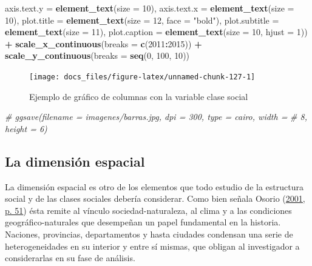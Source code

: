 \documentclass[
]{article}
\newenvironment{Shaded}{\begin{snugshade}}{\end{snugshade}}
\newcommand{\AttributeTok}[1]{\textcolor[rgb]{0.13,0.29,0.53}{#1}}
\newcommand{\CommentTok}[1]{\textcolor[rgb]{0.56,0.35,0.01}{\textit{#1}}}
\newcommand{\DecValTok}[1]{\textcolor[rgb]{0.00,0.00,0.81}{#1}}
\newcommand{\FunctionTok}[1]{\textcolor[rgb]{0.13,0.29,0.53}{\textbf{#1}}}
\newcommand{\NormalTok}[1]{#1}
\newcommand{\SpecialCharTok}[1]{\textcolor[rgb]{0.81,0.36,0.00}{\textbf{#1}}}
\newcommand{\StringTok}[1]{\textcolor[rgb]{0.31,0.60,0.02}{#1}}
\begin{document}
\begin{Shaded}
\begin{Highlighting}[]
    \AttributeTok{axis.text.y =} \FunctionTok{element\_text}\NormalTok{(}\AttributeTok{size =} \DecValTok{10}\NormalTok{), }\AttributeTok{axis.text.x =} \FunctionTok{element\_text}\NormalTok{(}\AttributeTok{size =} \DecValTok{10}\NormalTok{),}
    \AttributeTok{plot.title =} \FunctionTok{element\_text}\NormalTok{(}\AttributeTok{size =} \DecValTok{12}\NormalTok{, }\AttributeTok{face =} \StringTok{"bold"}\NormalTok{), }\AttributeTok{plot.subtitle =} \FunctionTok{element\_text}\NormalTok{(}\AttributeTok{size =} \DecValTok{11}\NormalTok{),}
    \AttributeTok{plot.caption =} \FunctionTok{element\_text}\NormalTok{(}\AttributeTok{size =} \DecValTok{10}\NormalTok{, }\AttributeTok{hjust =} \DecValTok{1}\NormalTok{)) }\SpecialCharTok{+} \FunctionTok{scale\_x\_continuous}\NormalTok{(}\AttributeTok{breaks =} \FunctionTok{c}\NormalTok{(}\DecValTok{2011}\SpecialCharTok{:}\DecValTok{2015}\NormalTok{)) }\SpecialCharTok{+}
    \FunctionTok{scale\_y\_continuous}\NormalTok{(}\AttributeTok{breaks =} \FunctionTok{seq}\NormalTok{(}\DecValTok{0}\NormalTok{, }\DecValTok{100}\NormalTok{, }\DecValTok{10}\NormalTok{))}
\end{Highlighting}
\end{Shaded}

\begin{figure}

{\centering \texttt{[image: docs\_files/figure-latex/unnamed-chunk-127-1]} 

}

\caption{Ejemplo de gráfico de columnas con la variable clase social}\label{fig:unnamed-chunk-127}
\end{figure}

\begin{Shaded}
\begin{Highlighting}[]
\CommentTok{\# ggsave(filename = \textquotesingle{}imagenes/barras.jpg\textquotesingle{}, dpi = 300, type = \textquotesingle{}cairo\textquotesingle{}, width =}
\CommentTok{\# 8, height = 6)}
\end{Highlighting}
\end{Shaded}

\hypertarget{espacial}{%
\subsection{La dimensión espacial}\label{espacial}}

La dimensión espacial es otro de los elementos que todo estudio de la estructura social y de las clases sociales debería considerar. Como bien señala Osorio (\protect\hyperlink{ref-Osorio2001}{2001, p. 51}) ésta remite al vínculo sociedad-naturaleza, al clima y a las condiciones geográfico-naturales que desempeñan un papel fundamental en la historia. Naciones, provincias, departamentos y hasta ciudades condensan una serie de heterogeneidades en su interior y entre sí mismas, que obligan al investigador a considerarlas en su fase de análisis.
\end{document}
